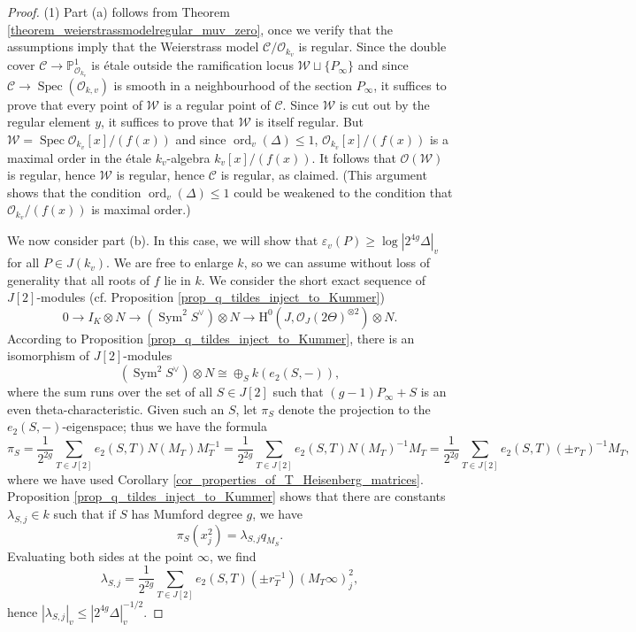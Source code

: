 \documentclass{article} %
\numberwithin{equation}{section}
\DeclareMathOperator{\Sym}{Sym}
\DeclareMathOperator{\Spec}{Spec}
\renewcommand{\P}{\mathbb{P}}
\renewcommand{\O}{\mathcal{O}}
\newcommand{\HH}{\mathrm{H}}
\newcommand{\cO}{\mathcal{O}}
\DeclareMathOperator{\ord}{ord}
\begin{document}
\begin{proof}
    (1) Part (a) follows from Theorem \ref{theorem_weierstrassmodelregular_muv_zero}, once we verify that the assumptions imply that the Weierstrass model $\mathcal{C}/\O_{k_v}$ is regular. 
    Since the double cover $\mathcal{C} \rightarrow \P^1_{\O_{k_v}}$ is \'etale outside the ramification locus $\mathcal{W}\sqcup \{P_{\infty}\}$ and since $\mathcal{C}\rightarrow \Spec(\O_{k,v})$ is smooth in a neighbourhood of the section $P_{\infty}$, it suffices to prove that every point of $\mathcal{W}$ is a regular point of $\mathcal{C}$.
    Since $\mathcal{W}$ is cut out by the regular element $y$, it suffices to prove that $\mathcal{W}$ is itself regular.
    But $\mathcal{W} = \Spec\O_{k_v}[x]/(f(x))$ and since $\ord_v(\Delta)\leq 1$, $\O_{k_v}[x]/(f(x))$ is a maximal order in the \'etale $k_v$-algebra  $k_v[x]/(f(x))$.
    It follows that $\O(\mathcal{W})$ is regular, hence $\mathcal{W}$ is regular, hence $\mathcal{C}$ is regular, as claimed. (This argument shows that the condition $\ord_v(\Delta) \leq 1$ could be weakened to the condition that $\cO_{k_v} / (f(x))$ is maximal order.)

    We now consider part (b). In this case, we will show that $\varepsilon_v(P) \geq \log | 2^{4g} \Delta |_v$ for all $P\in  J(k_v)$. We are free to enlarge $k$, so we can assume without loss of generality that all roots of $f$ lie in $k$. We consider the short exact sequence of $J[2]$-modules (cf. Proposition \ref{prop_q_tildes_inject_to_Kummer})
    \[ 0 \to I_K \otimes N \to (\Sym^2 S^\vee) \otimes N \to\HH^0(J, \O_J(2\Theta)^{\otimes 2}) \otimes N. \]
    According to Proposition \ref{prop_q_tildes_inject_to_Kummer}, there is an isomorphism of $J[2]$-modules 
    \[ (\Sym^2 S^\vee) \otimes N \cong \oplus_S k(e_2(S, -)), \]
    where the sum runs over the set of all $S \in J[2]$ such that $(g-1) P_\infty + S$ is an even theta-characteristic. Given such an $S$, let $\pi_S$ denote the projection to the $e_2(S, -)$-eigenspace; thus we have the formula
    \[ \pi_S = \frac{1}{2^{2g}} \sum_{T \in J[2]} e_2(S, T) N(M_T) M_T^{-1} = \frac{1}{2^{2g}} \sum_{T \in J[2]} e_2(S, T) N(M_T)^{-1} M_T = \frac{1}{2^{2g}} \sum_{T \in J[2]} e_2(S, T) (\pm r_{T})^{-1} M_T, \]
    where we have used Corollary \ref{cor_properties_of_T_Heisenberg_matrices}. Proposition \ref{prop_q_tildes_inject_to_Kummer} shows that there are constants $\lambda_{S, j} \in k$ such that if $S$ has Mumford degree $g$, we have
    \[ \pi_S(x_j^2) = \lambda_{S, j} q_{M_S}. \]
    Evaluating both sides at the point $\infty$, we find
    \[ \lambda_{S, j} =\frac{1}{2^{2g}} \sum_{T \in J[2]} e_2(S, T) (\pm r_{T}^{-1}) (M_T \infty)_j^2, \]
    hence $|\lambda_{S, j}|_v \leq | 2^{4g} \Delta |_v^{-1/2}$. 
    

\end{proof}
\end{document}
